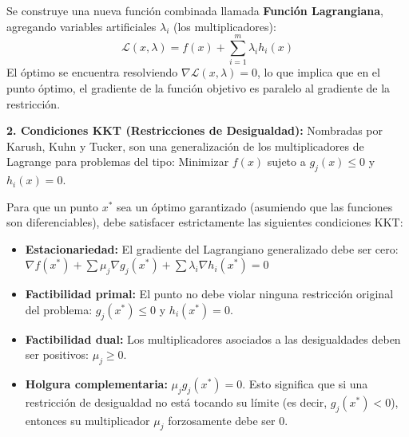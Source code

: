 \documentclass{article}
\begin{document}
	Se construye una nueva función combinada llamada \textbf{Función Lagrangiana}, agregando variables artificiales $\lambda_i$ (los multiplicadores):
	$$\mathcal{L}(x, \lambda) = f(x) + \sum_{i=1}^{m} \lambda_i h_i(x)$$
	El óptimo se encuentra resolviendo $\nabla \mathcal{L}(x, \lambda) = 0$, lo que implica que en el punto óptimo, el gradiente de la función objetivo es paralelo al gradiente de la restricción.
	
	\textbf{2. Condiciones KKT (Restricciones de Desigualdad):}
	Nombradas por Karush, Kuhn y Tucker, son una generalización de los multiplicadores de Lagrange para problemas del tipo:
	Minimizar $f(x)$ sujeto a $g_j(x) \le 0$ y $h_i(x) = 0$.
	
	Para que un punto $x^*$ sea un óptimo garantizado (asumiendo que las funciones son diferenciables), debe satisfacer estrictamente las siguientes condiciones KKT:
	\begin{itemize}
		\item \textbf{Estacionariedad:} El gradiente del Lagrangiano generalizado debe ser cero: \\ $\nabla f(x^*) + \sum \mu_j \nabla g_j(x^*) + \sum \lambda_i \nabla h_i(x^*) = 0$
		\item \textbf{Factibilidad primal:} El punto no debe violar ninguna restricción original del problema: $g_j(x^*) \le 0$ y $h_i(x^*) = 0$.
		\item \textbf{Factibilidad dual:} Los multiplicadores asociados a las desigualdades deben ser positivos: $\mu_j \ge 0$.
		\item \textbf{Holgura complementaria:} $\mu_j g_j(x^*) = 0$. Esto significa que si una restricción de desigualdad no está tocando su límite (es decir, $g_j(x^*) < 0$), entonces su multiplicador $\mu_j$ forzosamente debe ser $0$.
	\end{itemize}
	
	
	
\end{document}
